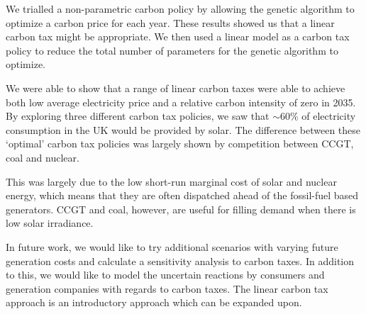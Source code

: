 We trialled a non-parametric carbon policy by allowing the genetic algorithm to optimize a carbon price for each year. These results showed us that a linear carbon tax might be appropriate. We then used a linear model as a carbon tax policy to reduce the total number of parameters for the genetic algorithm to optimize.  

We were able to show that a range of linear carbon taxes were able to achieve both low average electricity price and a relative carbon intensity of zero in 2035. By exploring three different carbon tax policies, we saw that ${\sim}$60\% of electricity consumption in the UK would be provided by solar. The difference between these `optimal' carbon tax policies was largely shown by competition between CCGT, coal and nuclear.

This was largely due to the low short-run marginal cost of solar and nuclear energy, which means that they are often dispatched ahead of the fossil-fuel based generators. CCGT and coal, however, are useful for filling demand when there is low solar irradiance.

In future work, we would like to try additional scenarios with varying future generation costs and calculate a sensitivity analysis to carbon taxes. In addition to this, we would like to model the uncertain reactions by consumers and generation companies with regards to carbon taxes. The linear carbon tax approach is an introductory approach which can be expanded upon.

